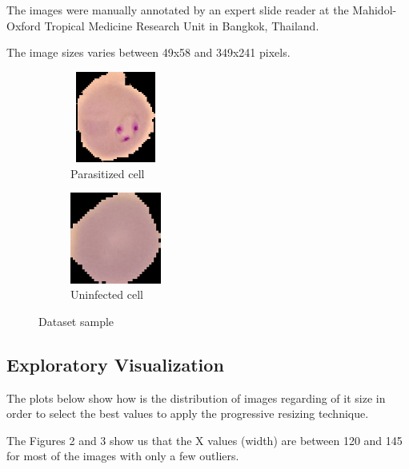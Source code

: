 \documentclass[a4paper]{article}
\begin{document}
	\medskip
	The images were manually annotated by an expert slide reader at the Mahidol-Oxford Tropical Medicine Research Unit in Bangkok, Thailand.
	
	\medskip
	The image sizes varies between 49x58 and 349x241 pixels.
	
	\begin{figure}[h!]
		\centering
		\begin{subfigure}[b]{0.4\linewidth}
			\centering
			\captionsetup{justification=centering}
			\includegraphics[width=3cm, height=3cm]{parasitized.png}
			\caption{Parasitized cell}
		\end{subfigure}\quad
		\begin{subfigure}[b]{0.4\linewidth}
			\centering
			\captionsetup{justification=centering}
			\includegraphics[width=3cm, height=3cm]{uninfected.png}
			\caption{Uninfected cell}
		\end{subfigure}
		\caption{Dataset sample}
		\label{fig:cells}
	\end{figure}

	\subsection{Exploratory Visualization}
	The plots below show how is the distribution of images regarding of it size in order to select the best values to apply the progressive resizing technique.
	
	\medskip
	The Figures 2 and 3 show us that the X values (width) are between 120 and 145 for most of the images with only a few outliers.
\end{document}
